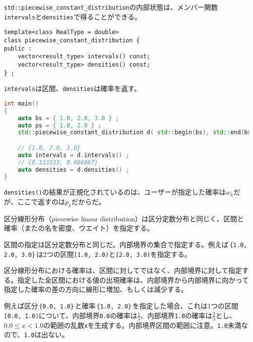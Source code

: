 
\texttt{std::piecewise\_constant\_distribution}の内部状態は、メンバー関数\texttt{intervals}と\texttt{densities}で得ることができる。

\begin{lstlisting}[style=grammar]
template<class RealType = double>
class piecewise_constant_distribution {
public :
    vector<result_type> intervals() const;
    vector<result_type> densities() const;
} ;
\end{lstlisting}

\texttt{intervals}は区間、\texttt{densities}は確率を返す。

\begin{lstlisting}[language={C++}]
int main()
{
    auto bs = { 1.0, 2.0, 3.0 } ;
    auto ps = { 1.0, 2.0 } ;
    std::piecewise_constant_distribution d( std::begin(bs), std::end(bs), std::begin(ps) ) ;

    // {1.0, 2.0, 3.0}
    auto intervals = d.intervals() ;
    // {0.333333, 0.666667}
    auto densities = d.densities() ;
}
\end{lstlisting}

\texttt{densities()}の結果が正規化されているのは、ユーザーが指定した確率は\(w_k\)だが、ここで返すのは\(p_k\)だからだ。



区分線形分布（piecewise linear distribution）は区分定数分布と同じく、区間と確率（またの名を密度、ウエイト）を指定する。

区間の指定は区分定数分布と同じだ。内部境界の集合で指定する。例えば\,\texttt{\{1.0, 2.0, 3.0\}}\,は2つの区間\texttt{[1.0, 2.0)}と\texttt{[2.0, 3.0)}を指定する。

区分線形分布における確率は、区間に対してではなく、内部境界に対して指定する。指定した全区間における値の出現確率は、内部境界から内部境界に向かって指定した確率の差の方向に線形に増加、もしくは減少する。

例えば区分\,\texttt{\{0.0, 1.0\}}\,と確率\,\texttt{\{1.0, 2.0\}}\,を指定した場合、これは1つの区間\texttt{[0.0, 1.0)}について、内部境界\texttt{0.0}の確率は\(\frac{1}{3}\)、内部境界\texttt{1.0}の確率は\(\frac{2}{3}\)とし、\(0.0 \leq x < 1.0\)の範囲の乱数\texttt{x}を生成する。内部境界区間の範囲に注意。\texttt{1.0}未満なので、\texttt{1.0}は出ない。

